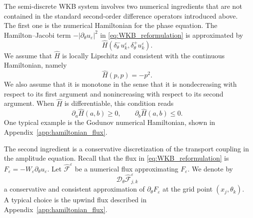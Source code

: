 \documentclass[11pt]{article}
\numberwithin{equation}{section}
\begin{document}
The semi-discrete WKB system involves two numerical ingredients that are not
contained in the standard second-order difference operators introduced above.
The first one is the numerical Hamiltonian for the phase equation. The
Hamilton--Jacobi term \(-|\partial_\theta u_\varepsilon|^2\) in \eqref{eq:WKB_reformulation} is approximated by
\[
\widehat H(\delta_\theta^-u_k^\varepsilon,\delta_\theta^+u_k^\varepsilon).
\]
We assume that \(\widehat H\) is locally Lipschitz and consistent with the
continuous Hamiltonian, namely
\[
\widehat H(p,p)=-p^2 .
\]
We also assume that it is monotone in the sense that it is nondecreasing with
respect to its first argument and nonincreasing with respect to its second
argument. When \(\widehat H\) is differentiable, this condition reads
\[
\partial_a\widehat H(a,b)\ge0,
\qquad
\partial_b\widehat H(a,b)\le0 .
\]
One typical example is the Godunov numerical Hamiltonian,
shown in Appendix~\ref{app:hamiltonian_flux}.


The second ingredient is a conservative discretization of the transport
coupling in the amplitude equation.  Recall that the  flux in \eqref{eq:WKB_reformulation} is
$
F_\varepsilon=-W_\varepsilon\partial_\theta u_\varepsilon .
$
Let $\widehat{\mathcal F}^{\varepsilon}$ be a numerical flux approximating
$F_\varepsilon$. 
We denote by
$$
\mathcal D_\theta \widehat{\mathcal F}^{\varepsilon}_{j,k}
$$
a conservative and consistent approximation of
$\partial_\theta F_\varepsilon$ at the grid point $(x_j,\theta_k)$.  A typical choice is the upwind flux described in
Appendix~\ref{app:hamiltonian_flux}.
\end{document}

